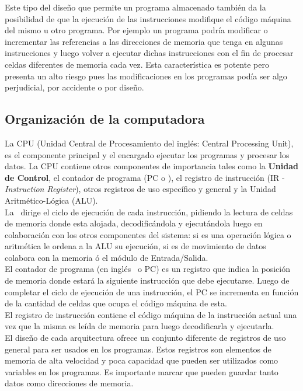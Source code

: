 Este tipo del diseño que permite un programa almacenado también da la posibilidad de que la ejecución de las instrucciones modifique el código máquina del mismo u otro programa. Por ejemplo un programa podría modificar o incrementar las referencias a las direcciones de memoria que tenga en algunas instrucciones y luego volver a ejecutar dichas instrucciones con el fin de procesar celdas diferentes de memoria cada vez. Esta característica es potente pero presenta un alto riesgo pues las modificaciones en los programas podía ser algo perjudicial, por accidente o por diseño.

\subsection{Organización de la computadora}

La CPU (Unidad Central de Procesamiento del inglés: Central Processing Unit), es el componente principal y el encargado ejecutar los programas y procesar los datos. La CPU contiene otros componentes de importancia tales como la \textbf{Unidad de Control}, el contador de programa (PC o \PC), el registro de instrucción (IR - \textit{Instruction Register}), otros registros de uso específico y general y la Unidad Aritmético-Lógica (ALU).\\

La \UC\ dirige el ciclo de ejecución de cada instrucción, pidiendo la lectura de celdas de memoria donde esta alojada, decodificándola  y ejecutándola luego en colaboración con los otros componentes del sistema: si es una operación lógica o aritmética le ordena a la ALU su ejecución, si es de movimiento de datos colabora con la memoria ó el módulo de Entrada/Salida.\\

El contador de programa (en inglés \PC\ o PC) es un registro que indica la posición de memoria donde estará la siguiente instrucción que debe ejecutarse. Luego de completar el ciclo de ejecución de una instrucción, el PC se incrementa en función de la cantidad de celdas que ocupa el código máquina de esta.\\

El registro de instrucción contiene el código máquina de la instrucción actual una vez que la misma es leída de memoria para luego decodificarla y ejecutarla.\\

El diseño de cada arquitectura ofrece un conjunto diferente de registros de uso general para ser usados en los programas. Estos registros son elementos de memoria de alta velocidad y poca capacidad que pueden ser utilizados como variables en los programas. Es importante marcar que pueden guardar tanto datos como direcciones de memoria.\\

